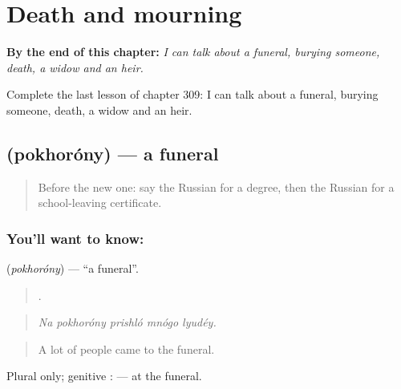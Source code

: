 
\chapter{Death and mourning}
\label{ch:ru-death-and-mourning}

\begin{chapteropening}
\textbf{By the end of this chapter:} \emph{I can talk about a funeral, burying someone, death, a widow and an heir.}

Complete the last lesson of chapter 309: I can talk about a funeral, burying someone, death, a widow and an heir.
\end{chapteropening}

\section[\texorpdfstring{\ru{похороны} (pokhoróny)}{похороны (pokhoróny)}]{ (pokhoróny) — a funeral}

\label{lesson:RU-C309-pokhorony}



\begin{quote}
Before the new one: say the Russian for a degree, then the Russian for a school-leaving certificate.
\end{quote}

\subsection*{You'll want to know: }
\textbf{} (\emph{pokhoróny}) — \textquotedblleft{}a funeral\textquotedblright{}.

\begin{quote}
    .
\end{quote}

\begin{quote}
\emph{Na pokhoróny prishló mnógo lyudéy.}
\end{quote}

\begin{quote}
A lot of people came to the funeral.
\end{quote}

Plural only; genitive \emph{}: \emph{ } — at the funeral.

